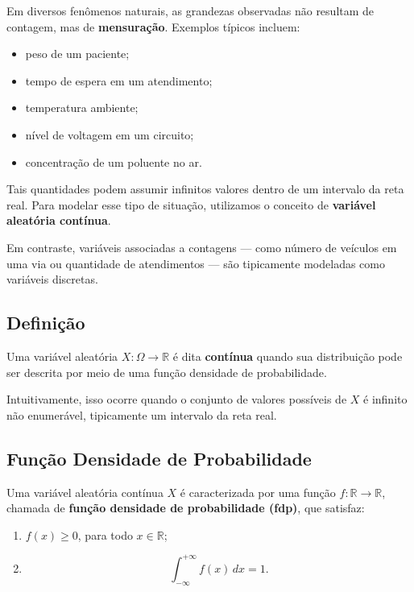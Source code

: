 Em diversos fenômenos naturais, as grandezas observadas não resultam de
contagem, mas de \textbf{mensuração}. Exemplos típicos incluem:

\begin{itemize}
    \item peso de um paciente;
    \item tempo de espera em um atendimento;
    \item temperatura ambiente;
    \item nível de voltagem em um circuito;
    \item concentração de um poluente no ar.
\end{itemize}

Tais quantidades podem assumir infinitos valores dentro de um intervalo da reta real.
Para modelar esse tipo de situação, utilizamos o conceito de
\textbf{variável aleatória contínua}. \vskip0.3cm

Em contraste, variáveis associadas a contagens — como número de veículos
em uma via ou quantidade de atendimentos — são tipicamente modeladas
como variáveis discretas.

\subsection*{Definição}

Uma variável aleatória $X:\Omega \to \mathbb{R}$ é dita
\textbf{contínua} quando sua distribuição pode ser descrita por meio de
uma função densidade de probabilidade. \vskip0.3cm

Intuitivamente, isso ocorre quando o conjunto de valores possíveis de $X$
é infinito não enumerável, tipicamente um intervalo da reta real.

\subsection{Função Densidade de Probabilidade}

Uma variável aleatória contínua $X$ é caracterizada por uma função
$f:\mathbb{R}\to\mathbb{R}$, chamada de
\textbf{função densidade de probabilidade (fdp)}, que satisfaz:

\begin{enumerate}
    \item $f(x)\ge 0$, para todo $x\in\mathbb{R}$;
    \item 
    \[
    \int_{-\infty}^{+\infty} f(x)\,dx = 1.
    \]
\end{enumerate}

